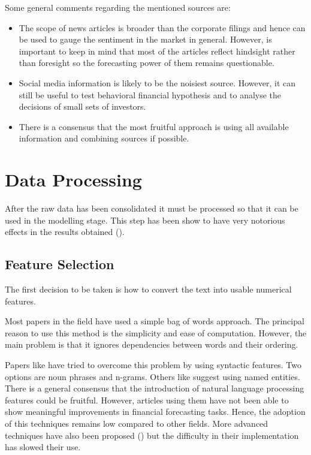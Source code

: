 \documentclass[a4paper, 12pt]{report}
\begin{document}
    Some general comments regarding the  mentioned sources are:
    \begin{itemize}
        \item {The scope of news articles is broader than the corporate filings and hence can be used to gauge the sentiment in the market in general. However, is important to keep in mind that most of the articles reflect hindsight rather than foresight so the forecasting power of them remains questionable.}
        \item{Social media information is likely to be the noisiest source. However, it can still be useful to test behavioral financial hypothesis and to analyse the decisions of small sets of investors.}
        \item{There is a consensus that the most fruitful approach is using all available information and combining sources if possible.}
    \end{itemize}
    
    \section{Data Processing}
    
    After the raw data has been consolidated it must be processed so that it can be used in the modelling stage. This step has been show to have very notorious effects in the results obtained (\textcite{Uysal:2014}).
    
    \subsection{Feature Selection}
    The first decision to be taken is how to convert the text into usable numerical features. 
    
    Most papers in the field have used a simple bag of words approach. The principal reason to use this method is the simplicity and ease of computation. However, the main problem is that it ignores dependencies between words and their ordering. 
    
    Papers like \textcite{Hagenau:2013} have tried to overcome this problem by using syntactic features. Two options are noun phrases and n-grams. Others like \textcite{Schumaker:2009} suggest using named entities. There is a general consensus that the introduction of natural language processing features could be fruitful. However, articles using them have not been able to show meaningful improvements in financial forecasting tasks. Hence, the adoption of this techniques remains low compared to other fields. More advanced techniques have also been proposed (\textcite{Uysal:2014}) but the difficulty in their implementation has slowed their use.
    
\end{document}
